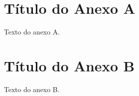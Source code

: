
\begin{anexosenv}
	
	\partanexos
	
	\chapter{Título do Anexo A}
	
	Texto do anexo A.
	
	\chapter{Título do Anexo B}
	
	Texto do anexo B.
	
\end{anexosenv}